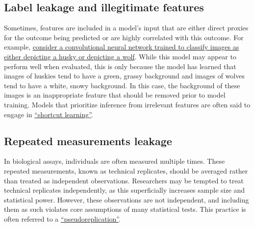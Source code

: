\documentclass[letterpaper, 12pt]{article}
\begin{document}
\subsection*{Label leakage and illegitimate features}

Sometimes, features are included in a model's input that are either direct proxies for the outcome being predicted or are highly correlated with this outcome. For example, \href{https://ucsc-ospo.github.io/report/osre24/nyu/data-leakage/20240924-shaivimalik/}{consider a convolutional neural network trained to classify images as either depicting a husky or depicting a wolf}. While this model may appear to perform well when evaluated, this is only because the model has learned that images of huskies tend to have a green, grassy background and images of wolves tend to have a white, snowy background. In this case, the background of these images is an inappropriate feature that should be removed prior to model training. Models that prioritize inference from irrelevant features are often said to engage in \href{https://doi.org/10.1038/s42256-020-00257-z}{``shortcut learning''}.


\subsection*{Repeated measurements leakage}

In biological assays, individuals are often measured multiple times. These repeated measurements, known as technical replicates, should be averaged rather than treated as independent observations. Researchers may be tempted to treat technical replicates independently, as this superficially increases sample size and statistical power. However, these observations are not independent, and including them as such violates core assumptions of many statistical tests. This practice is often referred to a \href{https://en.wikipedia.org/wiki/Pseudoreplication}{``pseudoreplication''}.
\end{document}
